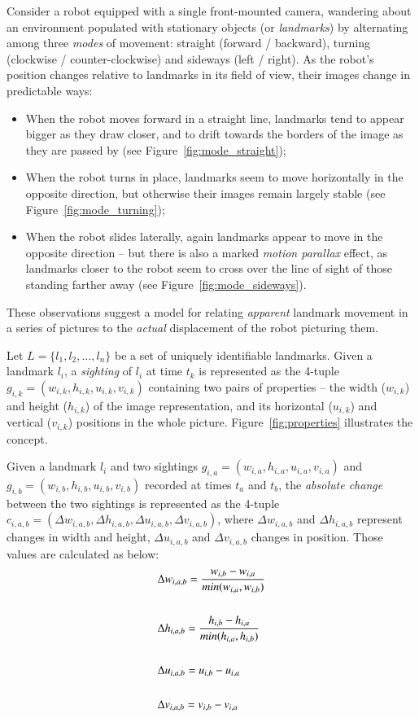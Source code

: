 \documentclass[twocolumn, 9pt]{jsproceedings}
\begin{document}
Consider a robot equipped with a single front-mounted camera, wandering about an environment populated with stationary objects (or {\it landmarks}) by alternating among three {\it modes} of movement: straight (forward / backward), turning (clockwise / counter-clockwise) and sideways (left / right). As the robot's position changes relative to landmarks in its field of view, their images change in predictable ways:

\begin{itemize}
\item When the robot moves forward in a straight line, landmarks tend to appear bigger as they draw closer, and to drift towards the borders of the image as they are passed by (see Figure~\ref{fig:mode_straight});
\item When the robot turns in place, landmarks seem to move horizontally in the opposite direction, but otherwise their images remain largely stable (see Figure~\ref{fig:mode_turning});
\item When the robot slides laterally, again landmarks appear to move in the opposite direction -- but there is also a marked {\it motion parallax} effect, as landmarks closer to the robot seem to cross over the line of sight of those standing farther away (see Figure~\ref{fig:mode_sideways}).
\end{itemize}

These observations suggest a model for relating {\it apparent} landmark movement in a series of pictures to the {\it actual} displacement of the robot picturing them.

Let \(L = \{l_1, l_2, \dotsc, l_n\}\) be a set of uniquely identifiable landmarks. Given a landmark \(l_i\), a {\it sighting} of \(l_i\) at time \(t_k\) is represented as the 4-tuple \(g_{i,k} = (w_{i,k}, h_{i,k}, u_{i,k}, v_{i,k})\) containing two pairs of properties -- the width (\(w_{i,k}\)) and height (\(h_{i,k}\)) of the image representation, and its horizontal (\(u_{i,k}\)) and vertical (\(v_{i,k}\)) positions in the whole picture. Figure~\ref{fig:properties} illustrates the concept.

Given a landmark \(l_i\) and two sightings \(g_{i,a} = (w_{i,a}, h_{i,a}, u_{i,a}, v_{i,a})\) and \(g_{i,b} = (w_{i,b}, h_{i,b}, u_{i,b}, v_{i,b})\) recorded at times \(t_a\) and \(t_b\), the {\it absolute change} between the two sightings is represented as the 4-tuple \(c_{i,a,b} = (\Delta w_{i,a,b}, \Delta h_{i,a,b}, \Delta u_{i,a,b}, \Delta v_{i,a,b})\), where \(\Delta w_{i,a,b}\) and \(\Delta h_{i,a,b}\) represent changes in width and height, \(\Delta u_{i,a,b}\) and \(\Delta v_{i,a,b}\) changes in position. Those values are calculated as below:
\begin{align}
& \Delta w_{i,a,b} = \frac{w_{i,b} - w_{i,a}}{min(w_{i,a}, w_{i,b})} \\
 \notag\\
& \Delta h_{i,a,b} = \frac{h_{i,b} - h_{i,a}}{min(h_{i,a}, h_{i,b})} \\
 \notag\\
& \Delta u_{i,a,b} = u_{i,b} - u_{i,a} \\
 \notag\\
& \Delta v_{i,a,b} = v_{i,b} - v_{i,a}
\end{align}
\end{document}
